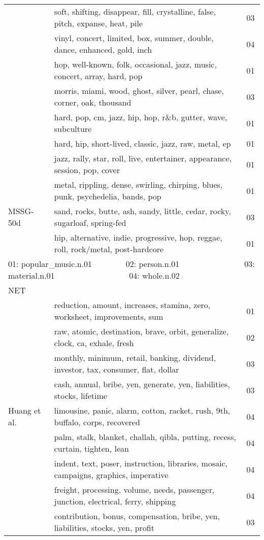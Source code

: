 \documentclass[11pt]{article}
\begin{document}
\begin{table}[htbp]
\begin{tabular}{|l|l|l|}
& soft, shifting, disappear, fill, crystalline, false, pitch, expanse, heat, pile & 03 \\
& vinyl, concert, limited, box, summer, double, dance, enhanced, gold, inch & 04 \\
& hop, well-known, folk, occasional, jazz, music, concert, array, hard, pop & 01\\
& morris, miami, wood, ghost, silver, pearl, chase, corner, oak, thousand & 03 \\
& hard, pop, cm, jazz, hip, hop, r\&b, gutter, wave, subculture & 01\\
& hard, hip, short-lived, classic, jazz, raw, metal, ep & 01\\
& jazz, rally, star, roll, live, entertainer, appearance, session, pop, cover & 01\\
\hline
\multirow{3}{*}{MSSG-50d} 
& metal, rippling, dense, swirling, chirping, blues, punk, psychedelia, bands, pop & 01\\
& sand, rocks, butte, ash, sandy, little, cedar, rocky, sugarloaf, spring-fed& 03\\
& hip, alternative, indie, progressive, hop, reggae, roll, rock/metal, post-hardcore& 01\\
\hline
\multicolumn{3}{l}{01: popular\_music.n.01 ~~~~~~~ 02: person.n.01~~~~~~~~~~~~~~~~03: material.n.01 ~~~~~~~~~~~~~~~~~ 04: whole.n.02} \\[0.2cm]
\multicolumn{3}{l}{NET}\\
\hline
\multirow{ 10}{*}{Huang et al.} &
reduction, amount, increases, stamina, zero, worksheet, improvements, sum & 01 \\
&raw, atomic, destination, brave, orbit, generalize, clock, ca, exhale, fresh & 02\\
&monthly, minimum, retail, banking, dividend, investor, tax, consumer, flat, dollar &03\\
&cash, annual, bribe, yen, generate, yen, liabilities, stocks, lifetime& 03\\
&limousine, panic, alarm, cotton, racket, rush, 9th, buffalo, corps, recovered&04\\
&palm, stalk, blanket, challah, qibla, putting, recess, curtain, tighten, lean&04\\
&indent, text, poser, instruction, libraries, mosaic, campaigns, graphics, imperative&04\\
&freight, processing, volume, needs, passenger, junction, electrical, ferry, shipping&04\\
&contribution, bonus, compensation, bribe, yen, liabilities, stocks, yen, profit&03\\

\end{tabular}
\end{table}
\end{document}
